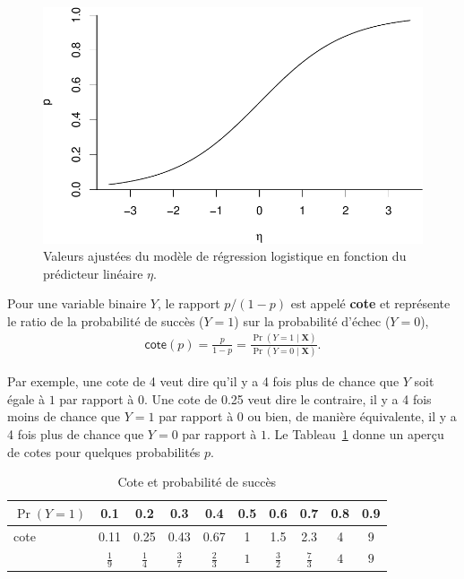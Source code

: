 \documentclass[
  11pt,
  letterpaper,
]{book}
\theoremstyle{definition}
\theoremstyle{remark}
\begin{document}
\begin{figure}[ht!]

{\centering \includegraphics[width=1\textwidth,height=\textheight]{./05-reglogistique_files/figure-pdf/fig-logitplot-1.pdf}

}

\caption{\label{fig-logitplot}Valeurs ajustées du modèle de régression
logistique en fonction du prédicteur linéaire \(\eta\).}

\end{figure}

Pour une variable binaire \(Y\), le rapport \(p/(1-p)\) est appelé
\textbf{cote} et représente le ratio de la probabilité de succès
(\(Y=1\)) sur la probabilité d'échec (\(Y=0\)), \begin{align*}
 \mathsf{cote}(p) = \frac{p}{1-p} = \frac{\Pr(Y=1 \mid \mathbf{X})}{\Pr(Y=0 \mid \mathbf{X})}.
\end{align*}

Par exemple, une cote de 4 veut dire qu'il y a 4 fois plus de chance que
\(Y\) soit égale à \(1\) par rapport à \(0\). Une cote de 0.25 veut dire
le contraire, il y a 4 fois moins de chance que \(Y=1\) par rapport à
\(0\) ou bien, de manière équivalente, il y a 4 fois plus de chance que
\(Y=0\) par rapport à \(1\). Le Tableau~\ref{tbl-cotes} donne un aperçu
de cotes pour quelques probabilités \(p\).

\hypertarget{tbl-cotes}{}
\begin{table}
\caption{\label{tbl-cotes}Cote et probabilité de succès }\tabularnewline

\centering
\begin{tabular}{lccccccccc}
\toprule
\(\Pr(Y=1)\) & 0.1 & 0.2 & 0.3 & 0.4 & 0.5 & 0.6 & 0.7 & 0.8 & 0.9\\
\midrule
cote & 0.11 & 0.25 & 0.43 & 0.67 & 1 & 1.5 & 2.3 & 4 & 9\\
 & \(\frac{1}{9}\) & \(\frac{1}{4}\) & \(\frac{3}{7}\) & \(\frac{2}{3}\) & \(1\) & \(\frac{3}{2}\) & \(\frac{7}{3}\) & \(4\) & \(9\)\\
\bottomrule
\end{tabular}
\end{table}
\end{document}
